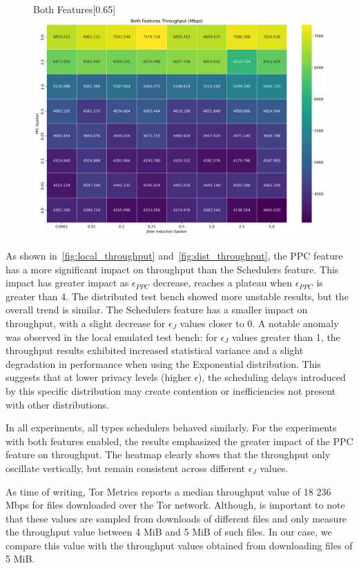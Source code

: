 \begin{figure}[htbp]
\begin{subcaptionbox}{Both Features\label{fig:dist_both_throughput}}[0.65\textwidth]
        {\includegraphics[width=\linewidth]{Chapters/Figures/Plots/dist_throughput_50_heatmap_5mib.png}}
    \end{subcaptionbox}
\end{figure}

As shown in~\autoref{fig:local_throughput} and~\autoref{fig:dist_throughput}, the PPC feature has a more significant impact on throughput than the Schedulers feature. 
This impact has greater impact as $\epsilon_{PPC}$ decrease, reaches a plateau when $\epsilon_{PPC}$ is greater than 4. The distributed test bench showed more unstable results, but the overall trend is similar. The Schedulers feature has a smaller impact on throughput, with a slight decrease for $\epsilon_{J}$ values closer to 0. A notable anomaly was observed in the local emulated test bench: for $\epsilon_{J}$ values greater than 1, the throughput results exhibited increased statistical variance and a slight degradation in performance when using the Exponential distribution. This suggests that at lower privacy levels (higher $\epsilon$), the scheduling delays introduced by this specific distribution may create contention or inefficiencies not present with other distributions.

In all experiments, all types schedulers behaved similarly.
For the experiments with both features enabled, the results emphasized the greater impact of the PPC feature on throughput. The heatmap clearly shows that the throughput only oscillate vertically, but remain consistent across different $\epsilon_{J}$ values.

As time of writing, Tor Metrics reports a median throughput value of 18 236 Mbps for files downloaded over the Tor network. Although, is important to note that these values are sampled from downloads of different files and only measure the throughput value between 4 MiB and 5 MiB of such files. In our case, we compare this value with the throughput values obtained from downloading files of 5 MiB.

